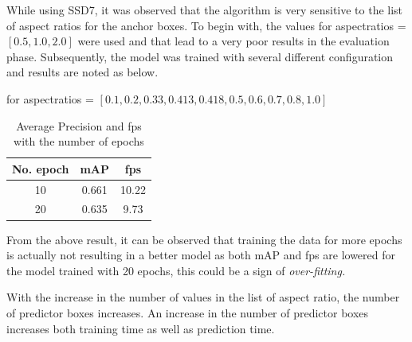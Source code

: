 \newpara
While using SSD7, it was observed that the algorithm is very sensitive to the list of aspect ratios for the anchor boxes. To begin with, the values for aspect\textunderscore ratios = $[0.5, 1.0, 2.0]$ were used and that lead to a very poor results in the evaluation phase. Subsequently, the model was trained with several different configuration and results are noted as below.

for aspect\textunderscore ratios = $[0.1, 0.2, 0.33, 0.413, 0.418, 0.5, 0.6, 0.7, 0.8, 1.0]$
\begin{table}[H]
\begin{center}
 \begin{tabular}{||c c c||} 
 \hline
 No. epoch & mAP & fps\\ [0.8ex] 
 \hline\hline
 10 & 0.661 & 10.22\\ 
 \hline
 20  & 0.635 & 9.73 \\
\hline
\end{tabular}
\caption{Average Precision and fps with the number of epochs}
\end{center}
\end{table}
From the above result, it can be observed that training the data for more epochs is actually not resulting in a better model as both mAP and fps are lowered for the model trained with 20 epochs, this could be a sign of \textit{over-fitting.}




With the increase in the number of values in the list of aspect ratio, the number of predictor boxes increases. An increase in the number of predictor boxes increases both training time as well as prediction time.
